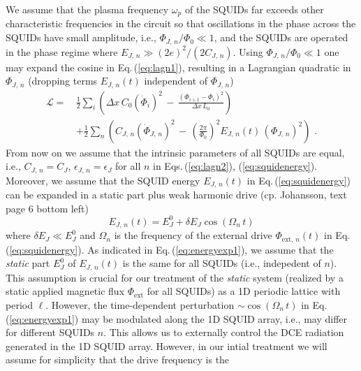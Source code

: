 We assume that the plasma frequency $\omega_p$ of the SQUIDs far exceeds other characteristic frequencies 
in the circuit so that oscillations in the phase across the SQUIDs have small amplitude, i.e., 
$\Phi_{J,\,n} / \Phi_0 \ll 1$,
and the SQUIDs are operated in the phase regime where $E_{J,\,n} \gg (2e)^2 / (2C_{J,\,n})$. 
Using $\Phi_{J,\,n} / \Phi_0 \ll 1$ one may expand the cosine in Eq.\,(\ref{eq:lagn1}), 
resulting in a Lagrangian quadratic in $\Phi_{J,\,n}$ (dropping terms $E_{J,\,n}(t)$ 
independent of $\Phi_{J,\,n}$)
%
\begin{equation} \label{eq:lagn2}
\begin{split}
\mathcal{L} = \, & \frac{1}{2} \sum_i \left( \Delta x \, C_{0} \left(\dot{\Phi}_{i}\right)^{2} \, - \, 
\frac{\left(\Phi_{i+1}-\Phi_{i}\right)^{2}}{\Delta x \, L_{0}} \right)  \\[2mm]
& + \frac{1}{2} \sum_n \left( C_{J,\,n} \left(\dot{\Phi}_{J,\,n} \right)^{2} \, - \, 
 \left(\frac{2 \pi}{\Phi_0} \right)^2 E_{J,\,n}(t) \, \left( \Phi_{J,\,n} \right)^2 
\right) \, \, .
\end{split}
\end{equation}
%
From now on we assume that the intrinsic parameters of all SQUIDs are equal, i.e., 
$C_{J,\,n} = C_J$, $\epsilon_{J,\,n} = \epsilon_J$ for all $n$ in Eqs.\,(\ref{eq:lagn2}), (\ref{eq:squidenergy}).  
Moreover, we assume that the SQUID energy $E_{J,\,n}(t)$ in Eq.\,(\ref{eq:squidenergy}) 
can be expanded in a static part plus weak harmonic drive 
(cp. Johansson, text page 6 bottom left)
%
\begin{equation} \label{eq:energyexp1}
E_{J,\,n}(t) = E_J^0 + \delta E_J \cos(\Omega_n \, t) 
\end{equation}
%
where $\delta E_J \ll E_J^0$ and $\Omega_n$ is the frequency of the external drive 
$\Phi_{\text{ext},\,n}(t)$ in Eq.\,(\ref{eq:squidenergy}).
As indicated in Eq.\,(\ref{eq:energyexp1}), we assume that the {\em static} part 
$E_J^0$ of $E_{J,\,n}(t)$ is the same for all SQUIDs (i.e., indepedent of $n$). 
This assumption is crucial for our 
treatment of the {\em static} system (realized by a static applied magnetic flux $\Phi_{\text{ext}}$
for all SQUIDs) as a 1D periodic lattice with period $\ell$. However, the 
time-dependent perturbation $\sim \cos(\Omega_n \, t)$ in Eq.\,(\ref{eq:energyexp1})
may be modulated along the 1D SQUID array, i.e., may differ for different SQUIDs $n$.   
This allows us to externally control the DCE radiation generated in the 1D SQUID array.
However, in our intial treatment we will assume for simplicity that the drive frequency is the 
